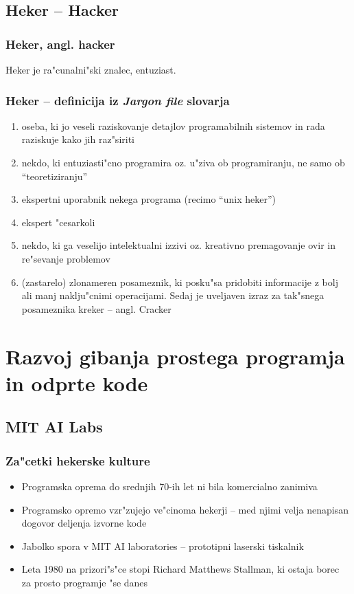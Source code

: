 \documentclass{beamer}
\begin{document}
\subsection{Heker -- Hacker}
\begin{frame}
\frametitle{Heker, angl. hacker}
\begin{block}{}
\begin{center}
Heker je ra"cunalni"ski znalec, entuziast.
\end{center}
\end{block}
\end{frame}
\begin{frame}
\frametitle{Heker -- definicija iz \textit{Jargon file} slovarja}
\begin{enumerate}
\item oseba, ki jo veseli raziskovanje detajlov programabilnih sistemov in rada raziskuje kako jih raz"siriti
\item nekdo, ki entuziasti"cno programira oz. u"ziva ob programiranju, ne samo ob ``teoretiziranju''
\item ekspertni uporabnik nekega programa (recimo ``unix heker'')
\item ekspert "cesarkoli
\item nekdo, ki ga veselijo intelektualni izzivi oz. kreativno premagovanje ovir in re"sevanje problemov
\item (zastarelo) zlonameren posameznik, ki posku"sa pridobiti informacije z bolj ali manj naklju"cnimi operacijami. Sedaj je uveljaven izraz za tak"snega posameznika kreker -- angl. Cracker
\end{enumerate}
\end{frame}


\section{Razvoj gibanja prostega programja in odprte kode}

\subsection{MIT AI Labs}
\begin{frame}
\frametitle{Za"cetki hekerske kulture}
\begin{itemize}
\item Programska oprema do srednjih 70-ih let ni bila komercialno zanimiva
\item Programsko opremo vzr"zujejo ve"cinoma hekerji -- med njimi velja nenapisan dogovor deljenja izvorne kode
\item Jabolko spora v MIT AI laboratories -- prototipni laserski tiskalnik
\item Leta 1980 na prizori"s"ce stopi Richard Matthews Stallman, ki ostaja borec za prosto programje "se danes
\end{itemize}
\end{frame}
\end{document}
